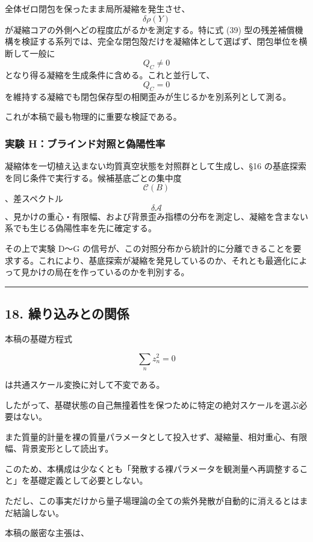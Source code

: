 \documentclass[
  a4paper,
]{ltjsarticle}
\begin{document}
全体ゼロ閉包を保ったまま局所凝縮を発生させ、\[\delta\rho(Y)\]
が凝縮コアの外側へどの程度広がるかを測定する。特に式 (39)
型の残差補償機構を検証する系列では、完全な閉包殻だけを凝縮体として選ばず、閉包単位を横断して一般に
\[Q_C\neq0\] となり得る凝縮を生成条件に含める。これと並行して、\[Q_C=0\]
を維持する凝縮でも閉包保存型の相関歪みが生じるかを別系列として測る。

これが本稿で最も物理的に重要な検証である。

\subsubsection{実験
H：ブラインド対照と偽陽性率}\label{ux5b9fux9a13-hux30d6ux30e9ux30a4ux30f3ux30c9ux5bfeux7167ux3068ux507dux967dux6027ux7387}

凝縮体を一切植え込まない均質真空状態を対照群として生成し、§16
の基底探索を同じ条件で実行する。候補基底ごとの集中度
\[\mathcal C(B)\]、差スペクトル
\[\delta\mathcal A\]、見かけの重心・有限幅、および背景歪み指標の分布を測定し、凝縮を含まない系でも生じる偽陽性率を先に確定する。

その上で実験 D〜G
の信号が、この対照分布から統計的に分離できることを要求する。これにより、基底探索が凝縮を発見しているのか、それとも最適化によって見かけの局在を作っているのかを判別する。

\begin{center}\rule{0.5\linewidth}{0.5pt}\end{center}

\subsection{18.
繰り込みとの関係}\label{ux7e70ux308aux8fbcux307fux3068ux306eux95a2ux4fc2}

本稿の基礎方程式

\[
\sum_n z_n^2=0
\]

は共通スケール変換に対して不変である。

したがって、基礎状態の自己無撞着性を保つために特定の絶対スケールを選ぶ必要はない。

また質量的計量を裸の質量パラメータとして投入せず、凝縮量、相対重心、有限幅、背景変形として読出す。

このため、本構成は少なくとも「発散する裸パラメータを観測量へ再調整すること」を基礎定義として必要としない。

ただし、この事実だけから量子場理論の全ての紫外発散が自動的に消えるとはまだ結論しない。

本稿の厳密な主張は、
\end{document}
